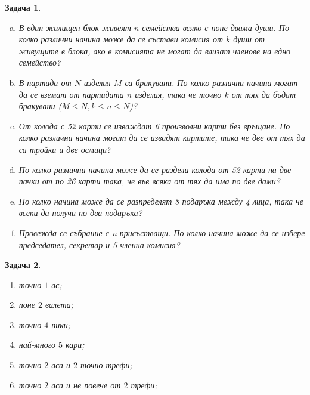 \documentclass[a4paper]{article}
\newtheorem{problem}{Задача}
\begin{document}
\begin{problem}
  \begin{enumerate}[a)]
  \item
    В един жилищен блок живеят $n$ семейства всяко с поне двама души.
    По колко различни начина може да се състави комисия от $k$ души от живущите в блока, ако
    в комисията не могат да влизат членове на едно семейство?
  \item
    В партида от $N$ изделия $M$ са бракувани.
    По колко различни начина могат да се вземат от партидата $n$ изделия, така че точно $k$ от тях да бъдат бракувани ($M\leq N, k\leq n\leq N$)?
  \item
    От колода с 52 карти се изваждат 6 произволни карти без връщане.
    По колко различни начина могат да се извадят картите, така че две от тях да са тройки и две осмици?
  \item
    По колко различни начина може да се раздели колода от 52 карти на две пачки от по 26 карти така, че във всяка от тях да има по две дами?
  \item
    По колко начина може да се разпределят 8 подаръка между 4 лица, така че всеки да получи по два подаръка?
  \item
    Провежда се събрание с n присъстващи.
    По колко начина може да се избере председател, секретар и 5 членна комисия?
\end{enumerate}
\end{problem}


\begin{problem}
  \begin{enumerate}
    От колода с $52$ карти се избират $11$. По колко различни начина могат да се изберат извадки, в които се срещат:
  \item
    точно $1$ ас;
  \item
    поне $2$ валета;
  \item
    точно $4$ пики;
  \item
    най-много $5$ кари;
  \item
    точно $2$ аса и $2$ точно трефи;
  \item
    точно $2$ аса и не повече от $2$ трефи;
\end{enumerate}
\end{problem}
\end{document}
